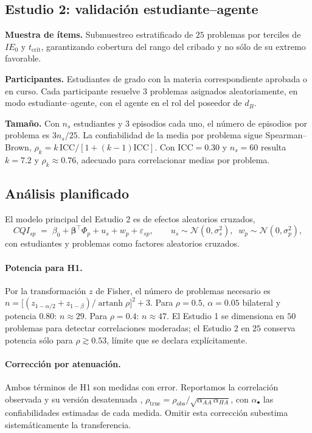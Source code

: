 \documentclass[11pt,a4paper]{article}
\theoremstyle{definition}
\theoremstyle{plain}
\theoremstyle{remark}
\begin{document}
\subsection{Estudio 2: validación estudiante--agente}

\textbf{Muestra de ítems.} Submuestreo estratificado de $25$ problemas por
terciles de $IE_0$ y $t_{\mathrm{crit}}$, garantizando cobertura del rango del
cribado y no sólo de su extremo favorable.

\textbf{Participantes.} Estudiantes de grado con la materia correspondiente
aprobada o en curso. Cada participante resuelve $3$ problemas asignados
aleatoriamente, en modo estudiante--agente, con el agente en el rol del
poseedor de $d_B$.

\textbf{Tamaño.} Con $n_s$ estudiantes y $3$ episodios cada uno, el número de
episodios por problema es $3n_s/25$. La confiabilidad de la media por problema
sigue Spearman--Brown, $\rho_k = k\,\mathrm{ICC}/[1+(k-1)\mathrm{ICC}]$. Con
$\mathrm{ICC}=0.30$ y $n_s=60$ resulta $k=7.2$ y $\rho_k\approx0.76$, adecuado
para correlacionar medias por problema.

\subsection{Análisis planificado}

El modelo principal del Estudio 2 es de efectos aleatorios cruzados,
\[
  CQI_{sp} \;=\; \beta_0 + \boldsymbol{\beta}^{\!\top}\Phi_p + u_s + w_p + \varepsilon_{sp},
  \qquad u_s\sim\mathcal{N}(0,\sigma_s^2),\;\; w_p\sim\mathcal{N}(0,\sigma_p^2),
\]
con estudiantes y problemas como factores aleatorios cruzados.

\paragraph{Potencia para H1.} Por la transformación $z$ de Fisher, el número de
problemas necesario es
$n = \big[(z_{1-\alpha/2}+z_{1-\beta})/\operatorname{artanh}\rho\big]^2+3$.
Para $\rho=0.5$, $\alpha=0.05$ bilateral y potencia $0.80$: $n\approx29$. Para
$\rho=0.4$: $n\approx47$. El Estudio 1 se dimensiona en $50$ problemas para
detectar correlaciones moderadas; el Estudio 2 en $25$ conserva potencia sólo para
$\rho\gtrsim0.53$, límite que se declara explícitamente.

\paragraph{Corrección por atenuación.} Ambos términos de H1 son medidas con
error. Reportamos la correlación observada y su versión desatenuada
\citep{spearman1904proof},
$\rho_{\text{true}} = \rho_{\text{obs}}/\sqrt{\alpha_{AA}\,\alpha_{HA}}$,
con $\alpha_\bullet$ las confiabilidades estimadas de cada medida. Omitir esta
corrección subestima sistemáticamente la transferencia.
\end{document}
